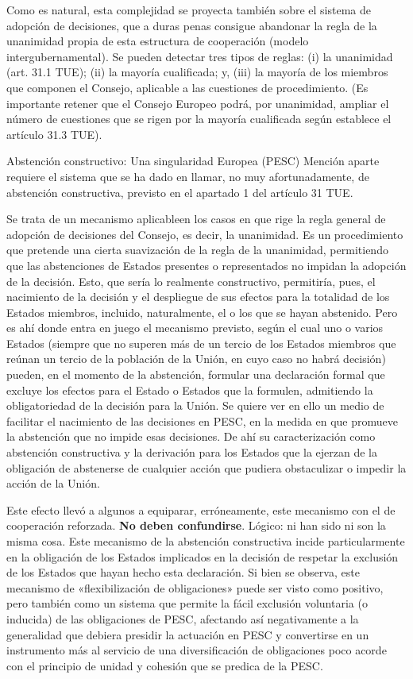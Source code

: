 \documentclass[10pt,a4paper]{article}
\begin{document}
Como es natural, esta complejidad se proyecta también sobre el sistema de adopción de decisiones, que a duras penas consigue abandonar la regla de la unanimidad propia de esta estructura de cooperación (modelo intergubernamental). Se pueden detectar tres tipos de reglas: (i) la unanimidad (art. 31.1 TUE); (ii) la mayoría cualificada; y, (iii) la mayoría de los miembros que componen el Consejo, aplicable a las cuestiones de procedimiento. (Es importante retener que el Consejo Europeo podrá, por unanimidad, ampliar el número de cuestiones que se rigen por la mayoría cualificada según establece el artículo 31.3 TUE).

\begin{speial}{Abstención constructivo: Una singularidad Europea (PESC)}
    Mención aparte requiere el sistema que se ha dado en llamar, no muy afortunadamente, de abstención constructiva, previsto en el apartado 1 del artículo 31 TUE. 
    
    Se trata de un mecanismo aplicableen los casos en que rige la regla general de adopción de decisiones del Consejo, es decir, la unanimidad. Es un procedimiento que pretende una cierta suavización de la regla de la unanimidad, permitiendo que las abstenciones de Estados presentes o representados no impidan la adopción de la decisión. Esto, que sería lo realmente constructivo, permitiría, pues, el nacimiento de la decisión y el despliegue de sus efectos para la totalidad de los Estados miembros, incluido, naturalmente, el o los que se hayan abstenido. Pero es ahí donde entra en juego el mecanismo previsto, según el cual uno o varios Estados (siempre que no superen más de un tercio de los Estados miembros que reúnan un tercio de la población de la Unión, en cuyo caso no habrá decisión) pueden, en el momento de la abstención, formular una declaración formal que excluye los efectos para el Estado o Estados que la formulen, admitiendo la obligatoriedad de la decisión para la Unión. Se quiere ver en ello un medio de facilitar el nacimiento de las decisiones en PESC, en la medida en que promueve la abstención que no impide esas decisiones. De ahí su caracterización como abstención constructiva y la derivación para los Estados que la ejerzan de la obligación de abstenerse de cualquier acción que pudiera obstaculizar o impedir la acción de la Unión. 
    
    Este efecto llevó a algunos a equiparar, erróneamente, este mecanismo con el de cooperación reforzada. \textbf{No deben confundirse}. Lógico: ni han sido ni son la misma cosa. Este mecanismo de la abstención constructiva incide particularmente en la obligación de los Estados implicados en la decisión de respetar la exclusión de los Estados que hayan hecho esta declaración. Si bien se observa, este mecanismo de «flexibilización de obligaciones» puede ser visto como positivo, pero también como un sistema que permite la fácil exclusión voluntaria (o inducida) de las obligaciones de PESC, afectando así negativamente a la generalidad que debiera presidir la actuación en PESC y convertirse en un instrumento más al servicio de una diversificación de obligaciones poco acorde con el principio de unidad y cohesión que se predica de la PESC.


\end{speial}
\end{document}
